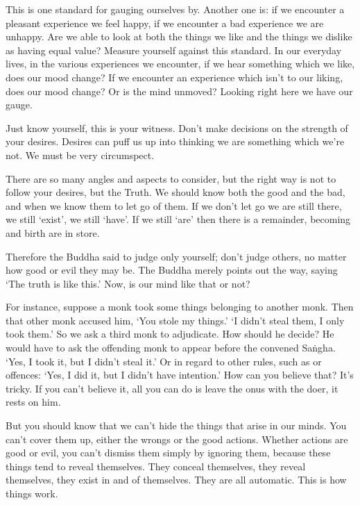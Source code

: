 This is one standard for gauging ourselves by. Another one is: if we encounter a pleasant experience we feel happy, if we encounter a bad experience we are unhappy. Are we able to look at both the things we like and the things we dislike as having equal value? Measure yourself against this standard. In our everyday lives, in the various experiences we encounter, if we hear something which we like, does our mood change? If we encounter an experience which isn't to our liking, does our mood change? Or is the mind unmoved? Looking right here we have our gauge. 

Just know yourself, this is your witness. Don't make decisions on the strength of your desires. Desires can puff us up into thinking we are something which we're not. We must be very circumspect. 

There are so many angles and aspects to consider, but the right way is not to follow your desires, but the Truth. We should know both the good and the bad, and when we know them to let go of them. If we don't let go we are still there, we still `exist', we still `have'. If we still `are'
then there is a remainder, becoming and birth are in store. 

Therefore the Buddha said to judge only yourself; don't judge others, no matter how good or evil they may be. The Buddha merely points out the way, saying `The truth is like this.' Now, is our mind like that or not? 

For instance, suppose a monk took some things belonging to another monk. Then that other monk accused him, `You stole my things.' `I didn't steal them, I only took them.' So we ask a third monk to adjudicate. How should he decide? He would have to ask the offending monk to appear before the convened Sa\.ngha. `Yes, I took it, but I didn't steal it.' Or in regard to other rules, such as  or  offences: `Yes, I did it, but I didn't have intention.' How can you believe that? It's tricky. If you can't believe it, all you can do is leave the onus with the doer, it rests on him. 

But you should know that we can't hide the things that arise in our minds. You can't cover them up, either the wrongs or the good actions. Whether actions are good or evil, you can't dismiss them simply by ignoring them, because these things tend to reveal themselves. They conceal themselves, they reveal themselves, they exist in and of themselves. They are all automatic. This is how things work. 

